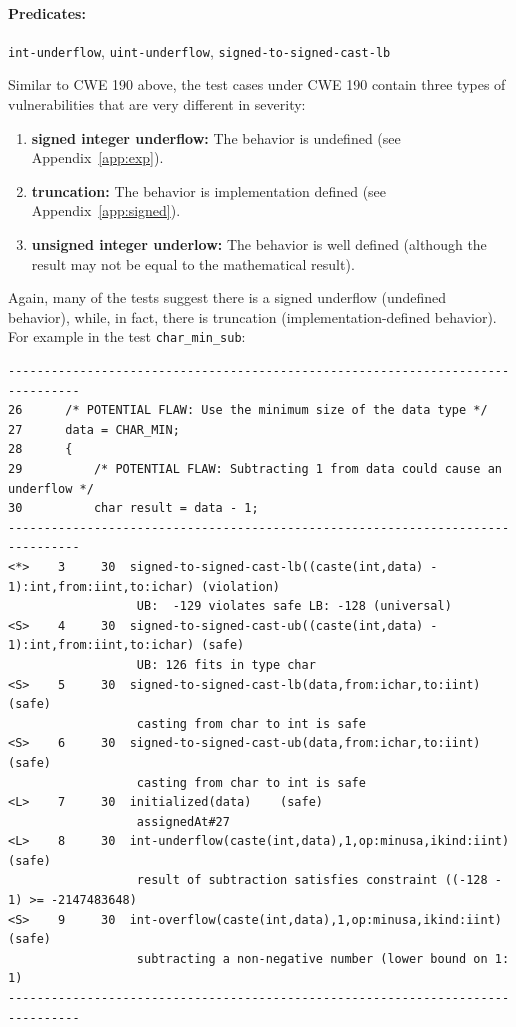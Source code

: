 \documentclass[11pt]{article}
\begin{document}
\paragraph{Predicates:} {\tt int-underflow}, {\tt uint-underflow},
{\tt signed-to-signed-cast-lb}

Similar to CWE 190 above, the test cases under CWE 190 contain three types of 
vulnerabilities that are very different
in severity:
\begin{enumerate}
\item {\bf signed integer underflow:} The behavior is undefined (see Appendix~\ref{app:exp}).
\item {\bf truncation:} The behavior is implementation defined (see Appendix~\ref{app:signed}).
\item {\bf unsigned integer underlow:} The behavior is well defined (although the result may
not be equal to the mathematical result).
\end{enumerate}

Again, many of the tests suggest there is a signed underflow (undefined behavior), 
while, in fact, there is truncation (implementation-defined behavior). For example in
the test {\tt char\_min\_sub}:
\begin{tiny}
\begin{verbatim}
--------------------------------------------------------------------------------
26      /* POTENTIAL FLAW: Use the minimum size of the data type */
27      data = CHAR_MIN;
28      {
29          /* POTENTIAL FLAW: Subtracting 1 from data could cause an underflow */
30          char result = data - 1;
--------------------------------------------------------------------------------
<*>    3     30  signed-to-signed-cast-lb((caste(int,data) - 1):int,from:iint,to:ichar) (violation)
                  UB:  -129 violates safe LB: -128 (universal)
<S>    4     30  signed-to-signed-cast-ub((caste(int,data) - 1):int,from:iint,to:ichar) (safe)
                  UB: 126 fits in type char
<S>    5     30  signed-to-signed-cast-lb(data,from:ichar,to:iint) (safe)
                  casting from char to int is safe
<S>    6     30  signed-to-signed-cast-ub(data,from:ichar,to:iint) (safe)
                  casting from char to int is safe
<L>    7     30  initialized(data)    (safe)
                  assignedAt#27
<L>    8     30  int-underflow(caste(int,data),1,op:minusa,ikind:iint) (safe)
                  result of subtraction satisfies constraint ((-128 - 1) >= -2147483648)
<S>    9     30  int-overflow(caste(int,data),1,op:minusa,ikind:iint) (safe)
                  subtracting a non-negative number (lower bound on 1: 1)
--------------------------------------------------------------------------------
\end{verbatim}
\end{tiny}
\end{document}
